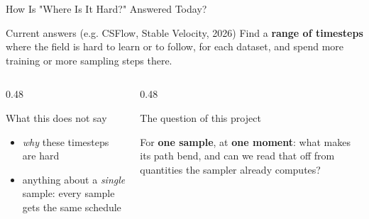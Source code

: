 \documentclass[aspectratio=169]{beamer}
\newcommand{\hl}[1]{\textcolor{coolpurple}{\textbf{#1}}}
\begin{document}
	\begin{frame}{How Is "Where Is It Hard?" Answered Today?}
		\begin{block}{Current answers (e.g. CSFlow, Stable Velocity, 2026)}
			\small Find a \hl{range of timesteps} where the field is hard to learn or to follow, for each dataset, and spend more training or more sampling steps there.
		\end{block}
		\vspace{0.4em}
		\begin{columns}[onlytextwidth, T]
			\begin{column}{0.48\textwidth}
				\begin{block}{What this does not say}
					\small
					\begin{minipage}[t][2.4cm][t]{\linewidth}
						\begin{itemize}
							\item \emph{why} these timesteps are hard
							\item anything about a \emph{single} sample: every sample gets the same schedule
						\end{itemize}
					\end{minipage}
				\end{block}
			\end{column}
			\begin{column}{0.48\textwidth}
				\begin{block}{The question of this project}
					\small
					\begin{minipage}[t][2.4cm][t]{\linewidth}
						For \hl{one sample}, at \hl{one moment}: what makes its path bend, and can we read that off from quantities the sampler already computes?
					\end{minipage}
				\end{block}
			\end{column}
		\end{columns}
	\end{frame}
\end{document}
